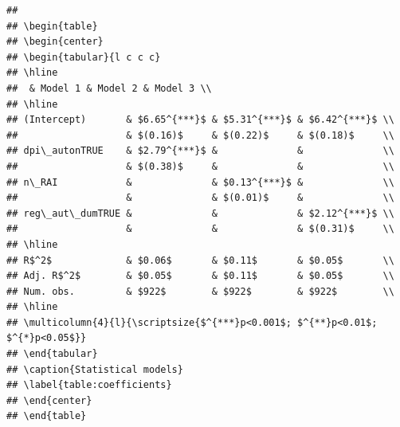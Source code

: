 \documentclass[
]{article}
\begin{document}
\begin{verbatim}
## 
## \begin{table}
## \begin{center}
## \begin{tabular}{l c c c}
## \hline
##  & Model 1 & Model 2 & Model 3 \\
## \hline
## (Intercept)       & $6.65^{***}$ & $5.31^{***}$ & $6.42^{***}$ \\
##                   & $(0.16)$     & $(0.22)$     & $(0.18)$     \\
## dpi\_autonTRUE    & $2.79^{***}$ &              &              \\
##                   & $(0.38)$     &              &              \\
## n\_RAI            &              & $0.13^{***}$ &              \\
##                   &              & $(0.01)$     &              \\
## reg\_aut\_dumTRUE &              &              & $2.12^{***}$ \\
##                   &              &              & $(0.31)$     \\
## \hline
## R$^2$             & $0.06$       & $0.11$       & $0.05$       \\
## Adj. R$^2$        & $0.05$       & $0.11$       & $0.05$       \\
## Num. obs.         & $922$        & $922$        & $922$        \\
## \hline
## \multicolumn{4}{l}{\scriptsize{$^{***}p<0.001$; $^{**}p<0.01$; $^{*}p<0.05$}}
## \end{tabular}
## \caption{Statistical models}
## \label{table:coefficients}
## \end{center}
## \end{table}
\end{verbatim}
\end{document}

